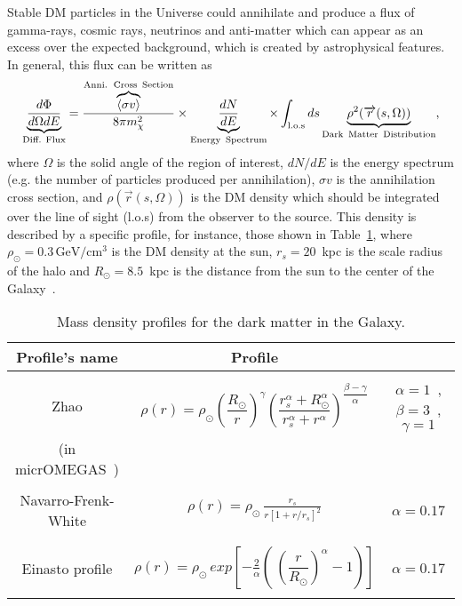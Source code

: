 \begin{itemize}
Stable DM particles in the Universe could annihilate and produce a flux of gamma-rays, cosmic rays, neutrinos and anti-matter which can appear as an excess over the expected background, which is created by astrophysical features. In general, this flux can be written as
%
\begin{equation}
\underbrace{\frac{d\Phi}{d\Omega dE}}_{\text{Diff. Flux}} =  \frac{ \overbrace{\langle\sigma v \rangle}^{\text{Anni.\, Cross\, Section}}}{8\pi m_{\chi}^2} \times \underbrace{\frac{dN}{dE}}_{\text{Energy\, Spectrum}} \times \int_{\text{l.o.s}} ds \underbrace{\rho^2 (\overrightarrow{r}(s,\Omega))}_{\text{Dark\, Matter\, Distribution}},
\label{eq:flux}
\end{equation}
%
where $\Omega$ is the solid angle of the region of interest, $dN/dE$ is the energy spectrum (e.g. the number of particles produced per annihilation), $\sigma v$ is the annihilation cross section, and $\rho (\overrightarrow{r}(s,\Omega))$ is the DM density which should be integrated over the line of sight (l.o.s) from the observer to the source. This density is described by a specific profile, for instance, those shown in Table~\ref{table:DM-profiles}, where $\rho_{\odot}=0.3\, \text{GeV}/\text{cm}^3$ is the DM density at the sun, $r_s=20$~kpc is the scale radius of the halo and $R_{\odot}=8.5$~kpc is the distance from the sun to the center of the Galaxy~\cite{belanger2014micromegas}.
%
\begin{table}[h]
\centering
\begin{tabular}{|c|c|c|}\hline
Profile's name & Profile & \\\hline\hline
 & & \\
Zhao & $\rho(r) = \rho_{\odot} \left(\dfrac{R_{\odot}}{r}\right)^{\gamma} \left(\dfrac{r_s^{\alpha}+R_{\odot}^{\alpha}}{r_s^{\alpha}+r^{\alpha}}\right)^{\dfrac{\beta-\gamma}{\alpha}}$ & $\alpha=1$ \,, $\beta=3$ \,, $\gamma=1$ \\
 (in micrOMEGAS~\cite{belanger2014micromegas}) & &  \\\hline
 &  & \\
 Navarro-Frenk-White & $\rho(r) = \rho_{\odot}\, \frac{r_s}{r[1+ r/r_s]^2}$ & $\alpha=0.17$\\
 & & \\\hline
 &  & \\
Einasto profile & $\rho(r) = \rho_{\odot} \, exp \left[ -\frac{2}{\alpha} \left(\,  \left(\dfrac{r}{R_{\odot}}\right)^{\alpha}-1 \right) \right]$ &   $\alpha=0.17$ \\
 & & \\\hline
\end{tabular}
\caption{Mass density profiles for the dark matter in the Galaxy.}
\label{table:DM-profiles}
\end{table}


\end{itemize}
